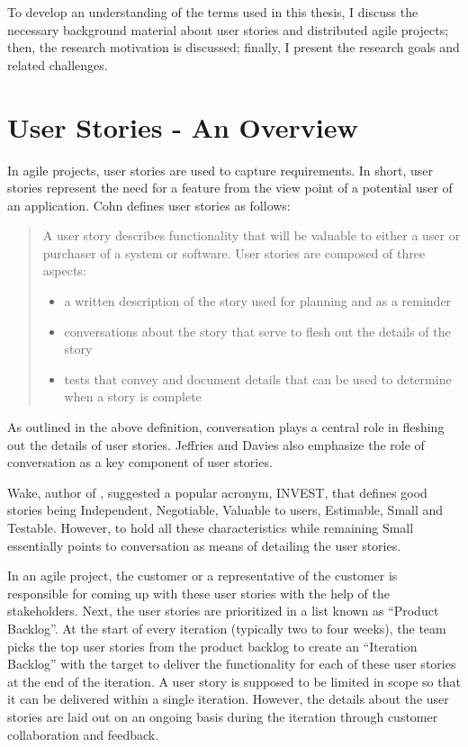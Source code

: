 To develop an understanding of the terms used in this thesis, I discuss the necessary background material about user stories and distributed agile projects; then, the research motivation is discussed; finally, I present the research goals and related challenges.

\section{User Stories - An Overview}
In agile projects, user stories are used to capture requirements. In short, user stories represent the need for a feature from the view point of a potential user of an application. Cohn \cite{user_stories_applied} defines user stories as follows:\\

\begin{quote}
	A user story describes functionality that will be valuable to either a user or purchaser of a system or software. User stories are composed of three aspects:
	\begin{itemize}
		\item a written description of the story used for planning and as a reminder
		\item conversations about the story that serve to flesh out the details of the story
		\item tests that convey and document details that can be used to determine when a story is complete
	\end{itemize}
\end{quote}

As outlined in the above definition, conversation plays a central role in fleshing out the details of user stories. Jeffries \cite{ron_jeffries} and Davies\cite{rachel_davies} also emphasize the role of conversation as a key component of user stories.

Wake, author of \cite{bill_wake}, suggested a popular acronym, INVEST, that defines good stories being Independent, Negotiable, Valuable to users, Estimable, Small and Testable. However, to hold all these characteristics while remaining Small essentially points to conversation as means of detailing the user stories.

In an agile project, the customer or a representative of the customer is responsible for coming up with these user stories with the help of the stakeholders. Next, the user stories are prioritized in a list known as ``Product Backlog''. At the start of every iteration (typically two to four weeks), the team picks the top user stories from the product backlog to create an ``Iteration Backlog'' with the target to deliver the functionality for each of these user stories at the end of the iteration. A user story is supposed to be limited in scope so that it can be delivered within a single iteration. However, the details about the user stories are laid out on an ongoing basis during the iteration through customer collaboration and feedback.

